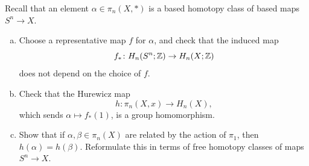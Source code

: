 \documentclass[12pt]{article}
\begin{document}
\begin{problem}[5]
Recall that an element $\alpha\in \pi_n(X,*)$ is a based homotopy class of based maps $S^n\to X$.
\begin{enumerate}[(a)]
    \item Choose a representative map $f$ for $\alpha$, and check that the induced map
    \[
    f_* \colon H_n(S^n;\mathbb{Z})\to H_n(X;\mathbb{Z})
    \]
    does not depend on the choice of $f$.
    \item Check that the Hurewicz map
    \[
    h\colon \pi_n(X,x)\to H_n(X),
    \]
    which sends $\alpha\mapsto f_*(1)$, is a group homomorphism.
    \item Show that if $\alpha,\beta\in \pi_n(X)$ are related by the action of $\pi_1$, then $h(\alpha)=h(\beta)$. Reformulate this in terms of free homotopy classes of maps $S^n\to X$.
\end{enumerate}
\end{problem}
\end{document}
